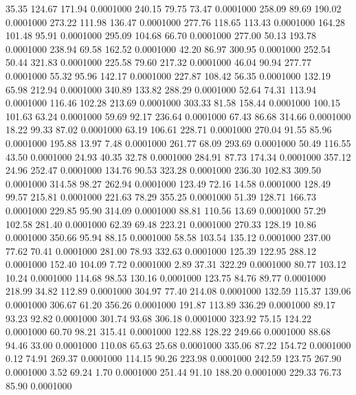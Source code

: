   35.35  124.67  171.94   0.0001000
 240.15   79.75   73.47   0.0001000
 258.09   89.69  190.02   0.0001000
 273.22  111.98  136.47   0.0001000
 277.76  118.65  113.43   0.0001000
 164.28  101.48   95.91   0.0001000
 295.09  104.68   66.70   0.0001000
 277.00   50.13  193.78   0.0001000
 238.94   69.58  162.52   0.0001000
  42.20   86.97  300.95   0.0001000
 252.54   50.44  321.83   0.0001000
 225.58   79.60  217.32   0.0001000
  46.04   90.94  277.77   0.0001000
  55.32   95.96  142.17   0.0001000
 227.87  108.42   56.35   0.0001000
 132.19   65.98  212.94   0.0001000
 340.89  133.82  288.29   0.0001000
  52.64   74.31  113.94   0.0001000
 116.46  102.28  213.69   0.0001000
 303.33   81.58  158.44   0.0001000
 100.15  101.63   63.24   0.0001000
  59.69   92.17  236.64   0.0001000
  67.43   86.68  314.66   0.0001000
  18.22   99.33   87.02   0.0001000
  63.19  106.61  228.71   0.0001000
 270.04   91.55   85.96   0.0001000
 195.88   13.97    7.48   0.0001000
 261.77   68.09  293.69   0.0001000
  50.49  116.55   43.50   0.0001000
  24.93   40.35   32.78   0.0001000
 284.91   87.73  174.34   0.0001000
 357.12   24.96  252.47   0.0001000
 134.76   90.53  323.28   0.0001000
 236.30  102.83  309.50   0.0001000
 314.58   98.27  262.94   0.0001000
 123.49   72.16   14.58   0.0001000
 128.49   99.57  215.81   0.0001000
 221.63   78.29  355.25   0.0001000
  51.39  128.71  166.73   0.0001000
 229.85   95.90  314.09   0.0001000
  88.81  110.56   13.69   0.0001000
  57.29  102.58  281.40   0.0001000
  62.39   69.48  223.21   0.0001000
 270.33  128.19   10.86   0.0001000
 350.66   95.94   88.15   0.0001000
  58.58  103.54  135.12   0.0001000
 237.00   77.62   70.41   0.0001000
 281.00   78.93  332.63   0.0001000
 125.39  122.95  288.12   0.0001000
 152.40  104.09    7.72   0.0001000
   2.89   37.31  322.29   0.0001000
  80.77  103.12   10.24   0.0001000
 114.68   98.53  130.16   0.0001000
 123.75   84.76   89.77   0.0001000
 218.99   34.82  112.89   0.0001000
 304.97   77.40  214.08   0.0001000
 132.59  115.37  139.06   0.0001000
 306.67   61.20  356.26   0.0001000
 191.87  113.89  336.29   0.0001000
  89.17   93.23   92.82   0.0001000
 301.74   93.68  306.18   0.0001000
 323.92   75.15  124.22   0.0001000
  60.70   98.21  315.41   0.0001000
 122.88  128.22  249.66   0.0001000
  88.68   94.46   33.00   0.0001000
 110.08   65.63   25.68   0.0001000
 335.06   87.22  154.72   0.0001000
   0.12   74.91  269.37   0.0001000
 114.15   90.26  223.98   0.0001000
 242.59  123.75  267.90   0.0001000
   3.52   69.24    1.70   0.0001000
 251.44   91.10  188.20   0.0001000
 229.33   76.73   85.90   0.0001000
